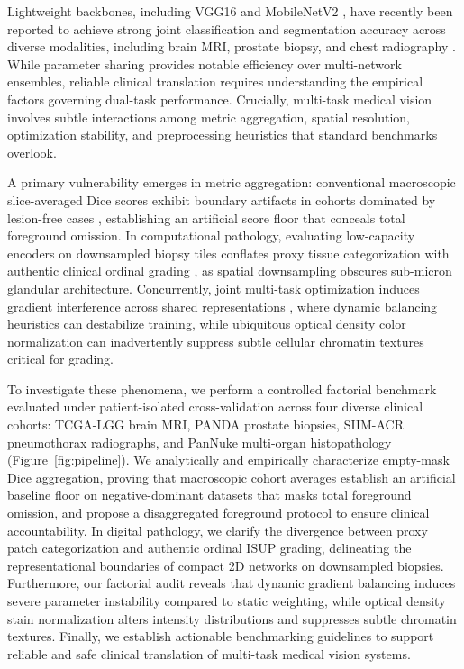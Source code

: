 \documentclass[conference,a4paper]{IEEEtran}
\begin{document}
Lightweight backbones, including VGG16 \cite{simonyan2014very} and MobileNetV2 \cite{sandler2018mobilenetv2}, have recently been reported to achieve strong joint classification and segmentation accuracy across diverse modalities, including brain MRI, prostate biopsy, and chest radiography \cite{rhanoui2025multitask}. While parameter sharing provides notable efficiency over multi-network ensembles, reliable clinical translation requires understanding the empirical factors governing dual-task performance. Crucially, multi-task medical vision involves subtle interactions among metric aggregation, spatial resolution, optimization stability, and preprocessing heuristics that standard benchmarks overlook.

A primary vulnerability emerges in metric aggregation: conventional macroscopic slice-averaged Dice scores exhibit boundary artifacts in cohorts dominated by lesion-free cases \cite{reinke2024metrics,eelbode2020optimization,liu2024dice}, establishing an artificial score floor that conceals total foreground omission. In computational pathology, evaluating low-capacity encoders on downsampled biopsy tiles conflates proxy tissue categorization with authentic clinical ordinal grading \cite{bulten2022artificial}, as spatial downsampling obscures sub-micron glandular architecture. Concurrently, joint multi-task optimization induces gradient interference across shared representations \cite{standley2020tasks,crawshaw2020survey}, where dynamic balancing heuristics can destabilize training, while ubiquitous optical density color normalization can inadvertently suppress subtle cellular chromatin textures critical for grading.

To investigate these phenomena, we perform a controlled factorial benchmark evaluated under patient-isolated cross-validation across four diverse clinical cohorts: TCGA-LGG brain MRI, PANDA prostate biopsies, SIIM-ACR pneumothorax radiographs, and PanNuke multi-organ histopathology (Figure~\ref{fig:pipeline}). We analytically and empirically characterize empty-mask Dice aggregation, proving that macroscopic cohort averages establish an artificial baseline floor on negative-dominant datasets that masks total foreground omission, and propose a disaggregated foreground protocol to ensure clinical accountability. In digital pathology, we clarify the divergence between proxy patch categorization and authentic ordinal ISUP grading, delineating the representational boundaries of compact 2D networks on downsampled biopsies. Furthermore, our factorial audit reveals that dynamic gradient balancing induces severe parameter instability compared to static weighting, while optical density stain normalization alters intensity distributions and suppresses subtle chromatin textures. Finally, we establish actionable benchmarking guidelines to support reliable and safe clinical translation of multi-task medical vision systems.
\end{document}
